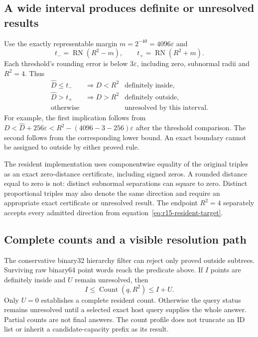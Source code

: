 \subsection{A wide interval produces definite or unresolved results}
Use the exactly representable margin $m=2^{-40}=4096\varepsilon$ and
\begin{equation}
 t_-=\operatorname{RN}(R^2-m),\qquad
 t_+=\operatorname{RN}(R^2+m).
 \label{eq:r15-resident-thresholds}
\end{equation}
Each threshold's rounding error is below $3\varepsilon$, including zero,
subnormal radii and $R^2=4$. Thus
\begin{equation}
 \begin{array}{lll}
 \widehat D\le t_-&\Longrightarrow D<R^2&\text{definitely inside},\\
 \widehat D>t_+&\Longrightarrow D>R^2&\text{definitely outside},\\
 \text{otherwise}&&\text{unresolved by this interval}.
 \end{array}
 \label{eq:r15-resident-classification}
\end{equation}
For example, the first implication follows from
$D<\widehat D+256\varepsilon
 <R^2-(4096-3-256)\varepsilon$ after the threshold comparison.
The second follows from the corresponding lower bound. An exact boundary
cannot be assigned to outside by either proved rule.

The resident implementation uses componentwise equality of the original
triples as an exact
zero-distance certificate, including signed zeros. A rounded distance equal
to zero is not: distinct subnormal separations can square to zero. Distinct
proportional triples may also denote the same direction and require an
appropriate exact certificate or unresolved result. The endpoint $R^2=4$
separately accepts every admitted direction from
equation~\eqref{eq:r15-resident-target}.

\subsection{Complete counts and a visible resolution path}
The conservative binary32 hierarchy filter can reject only proved outside
subtrees. Surviving raw binary64 point words reach the predicate above. If
$I$ points are definitely inside and $U$ remain unresolved, then
\begin{equation}
 I\le\operatorname{Count}(q,R^2)\le I+U.
 \label{eq:r15-resident-count}
\end{equation}
Only $U=0$ establishes a complete resident count. Otherwise the query status
remains unresolved until a selected exact host query supplies the whole
answer. Partial counts are not final answers. The count profile does not
truncate an ID list or inherit a candidate-capacity prefix as its result.

